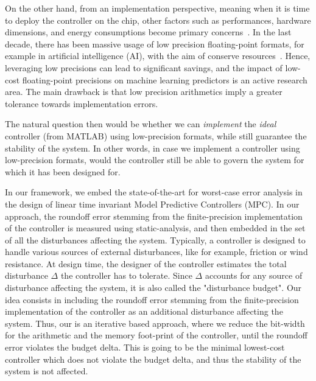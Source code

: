 %
%
On the other hand, from an implementation perspective, meaning when it is time to deploy the controller on the chip, other factors such as performances, hardware dimensions, and energy consumptions become primary concerns~\cite{suardi}.
%
In the last decade, there has been massive usage of low precision floating-point formats, for example in artificial intelligence (AI), with the aim of conserve resources~\cite{fppower}.
%
Hence, leveraging low precisions can lead to significant savings, and the impact of low-cost floating-point precisions on machine learning predictors is an active research area.
%
The main drawback is that low precision arithmetics imply a greater tolerance towards implementation errors.
%

The natural question then would be whether we can \emph{implement} the \emph{ideal} controller (from MATLAB) using low-precision formats, while still guarantee the stability of the system.
%
In other words, in case we implement a controller using low-precision formats, would the controller still be able to govern the system for which it has been designed for.
%

In our framework, we embed the state-of-the-art for worst-case error analysis in the design of linear time invariant Model Predictive Controllers (MPC).
%
In our approach, the roundoff error stemming from the finite-precision implementation of the controller is measured using static-analysis, and then embedded in the set of all the disturbances affecting the system.
%
Typically, a controller is designed to handle various sources of external disturbances, like for example, friction or wind resistance.
%
At design time, the designer of the controller estimates the total disturbance $\Delta$ the controller has to tolerate.
%
Since $\Delta$ accounts for any source of disturbance affecting the system, it is also called the "disturbance budget".
%
Our idea consists in including the roundoff error stemming from the finite-precision implementation of the controller as an additional disturbance affecting the system.
%
Thus, our is an iterative based approach, where we reduce the bit-width for the arithmetic and the memory foot-print of the controller, until the roundoff error violates the budget delta.
%
This is going to be the minimal lowest-cost controller which does not violate the budget delta, and thus the stability of the system is not affected.
%

